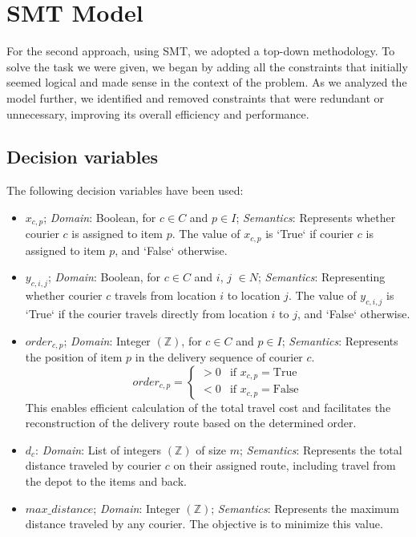 \section{SMT Model}
For the second approach, using SMT, we adopted a top-down methodology. To solve the task we were given, we began by adding all the constraints that initially seemed logical and made sense in the context of the problem. As we analyzed the model further, we identified and removed constraints that were redundant or unnecessary, improving its overall efficiency and performance.
\subsection{Decision variables}
The following decision variables have been used:
\begin{itemize}
    \item $x_{c,p}$; \textit{Domain}: Boolean, for $c \in C$ and $p \in I$; \textit{Semantics}: Represents whether courier $c$ is assigned to item $p$. The value of $x_{c,p}$ is `True` if courier $c$ is assigned to item $p$, and `False` otherwise.
    
    \item $y_{c,i,j}$; \textit{Domain}: Boolean, for $c \in C$ and $i$, $j$ $\in N$; \textit{Semantics}: Representing whether courier $c$ travels from location $i$ to location $j$. The value of $y_{c,i,j}$ is `True` if the courier travels directly from location $i$ to $j$, and `False` otherwise.
    
    \item $order_{c,p}$; \textit{Domain}: Integer $(\mathbb{Z})$, for $c \in C$ and $p \in I$; \textit{Semantics}: Represents the position of item $p$ in the delivery sequence of courier $c$.
    \[
    order_{c,p} = \begin{cases} 
    > 0 & \text{if } x_{c,p} = \text{True} \\
    < 0 & \text{if } x_{c,p} = \text{False}
    \end{cases}
    \]
    This enables efficient calculation of the total travel cost and facilitates the reconstruction of the delivery route based on the determined order.

    \item $d_{c}$: \textit{Domain}: List of integers $(\mathbb{Z})$ of size $m$; \textit{Semantics}: Represents the total distance traveled by courier $c$ on their assigned route, including travel from the depot to the items and back.

    \item $max\_distance$; \textit{Domain}: Integer $(\mathbb{Z})$; \textit{Semantics}: Represents the maximum distance traveled by any courier. The objective is to minimize this value.


\end{itemize}


